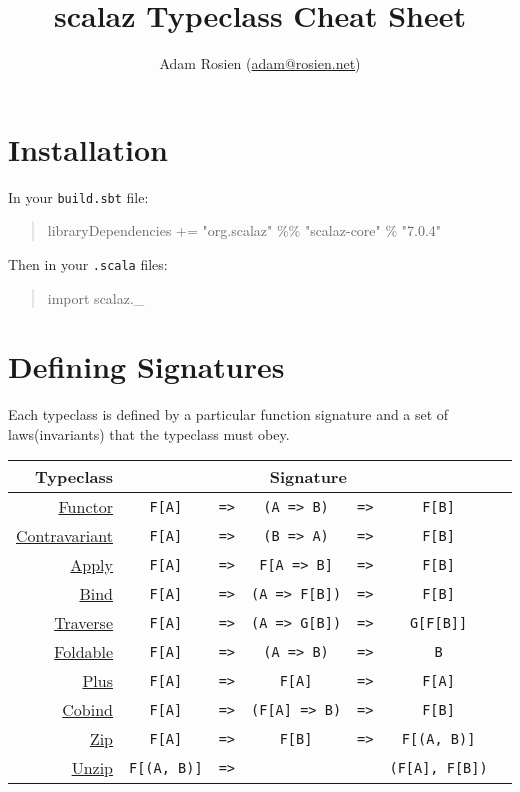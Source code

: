 \documentclass{tufte-handout}
\title{scalaz Typeclass Cheat Sheet}
\author[Adam Rosien]{Adam Rosien (\href{mailto:adam@rosien.net}{adam@rosien.net})}
\newcommand{\fa}{F[A]}
\newcommand{\fb}{F[B]}
\newcommand{\rarr}{\texttt{=>}}
\newcommand{\fTwo}[2]{\texttt{#1} & \rarr & & & \texttt{#2}}
\newcommand{\fThree}[3]{\texttt{#1} & \rarr & \texttt{#2} & \rarr & \texttt{#3}}
\newcommand{\sdocUrl}[1]{http://docs.typelevel.org/api/scalaz/stable/7.0.4/doc/\#scalaz.#1}
\newcommand{\sdocHref}[1]{\href{\sdocUrl{#1}}{#1}}
\begin{document}
\maketitle%

\section{Installation}\label{sec:installation}

\noindent In your \texttt{build.sbt} file:

\begin{quote}
  \ttfamily libraryDependencies += "org.scalaz" \%\% "scalaz-core" \% "7.0.4"
\end{quote}

\noindent Then in your \texttt{.scala} files:

\begin{quote}
  \ttfamily import scalaz.\_
\end{quote}

\section{Defining Signatures}

Each typeclass is defined by a particular function signature and a set of laws\footnotemark (invariants) that the typeclass must obey.


\begin{table}[ht]
  \centering
  \selectfont
  \setlength{\tabcolsep}{5pt}
  \begin{tabular}{rcrcccl}
    Typeclass & \multicolumn{5}{c}{Signature} \\
    \midrule
    \sdocHref{Functor}               & \fThree{\fa}{(A => B)}{\fb} \\
    \sdocHref{Contravariant}         & \fThree{\fa}{(B => A)}{\fb} \\
    \sdocHref{Apply}\footnotemark    & \fThree{\fa}{F[A => B]}{\fb} \\
    \sdocHref{Bind}                  & \fThree{\fa}{(A => F[B])}{\fb} \\
    \sdocHref{Traverse}\footnotemark & \fThree{\fa}{(A => G[B])}{G[F[B]]} \\
    \sdocHref{Foldable}\footnotemark & \fThree{\fa}{(A => B)}{B} \\
    \sdocHref{Plus}                  & \fThree{\fa}{\fa}{\fa} \\
    \sdocHref{Cobind}                & \fThree{\fa}{(F[A] => B)}{\fb} \\
    \sdocHref{Zip}                   & \fThree{\fa}{\fb}{F[(A, B)]} \\
    \sdocHref{Unzip}                 & \fTwo{F[(A, B)]}{(F[A], F[B])} \\
  \end{tabular}
  \label{tab:normaltab}
\end{table}
\end{document}
